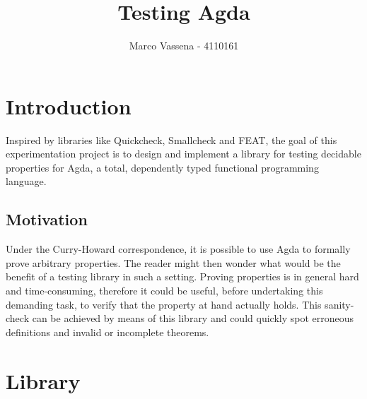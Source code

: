 \documentclass[10pt,a4paper]{report}
\author{Marco Vassena - 4110161}
\title{Testing Agda}
\begin{document}
\maketitle

\section*{Introduction}
Inspired by libraries like Quickcheck, Smallcheck and FEAT, the goal of this experimentation project is to design and implement a library for testing decidable properties for Agda, a total, dependently typed functional programming language.

\subsection*{Motivation}
Under the Curry-Howard correspondence, it is possible to use Agda to formally prove arbitrary properties. The reader might then wonder what would be the benefit of a testing library in such a setting. Proving properties is in general hard and time-consuming, therefore it could be useful, before undertaking this demanding task, to verify that the property at hand actually holds. This sanity-check can be achieved by means of this library and could quickly spot erroneous definitions and invalid or incomplete theorems.

\section*{Library}
\end{document}
